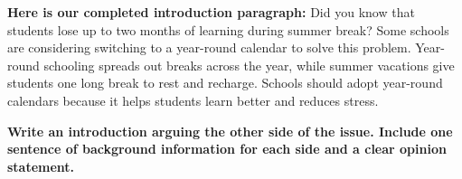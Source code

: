 \documentclass[12pt]{article}
\begin{document}
\begin{tcolorbox}[colframe=black!60, colback=white, 
coltitle=black, colbacktitle=black!15, fonttitle=\bfseries\Large, 
title=Examples, halign title=center, left=10pt, right=10pt, top=10pt, bottom=15pt]
\vspace{1em}

\textbf{Here is  our completed introduction paragraph:} Did you know that students lose up to two months of learning during summer break? Some schools are considering switching to a year-round calendar to solve this problem. Year-round schooling spreads out breaks across the year, while summer vacations give students one long break to rest and recharge. Schools should adopt year-round calendars because it helps students learn better and reduces stress. 










     \end{tcolorbox}

\vspace{1em}
\begin{tcolorbox}[colframe=black!60, colback=white, 
coltitle=black, colbacktitle=black!15, fonttitle=\bfseries\Large, 
title=Guided Practice, halign title=center, left=10pt, right=10pt, top=10pt, bottom=15pt]
\textbf{Write an introduction arguing the other side of the issue. Include one sentence of background information for each side and a clear opinion statement.} 
\vspace{1cm}
\begin{enumerate}[itemsep=4em] %
\\[0.8cm] \underline{\hspace{14.3cm}}  
    \\[0.8cm] \underline{\hspace{14.3cm}}  
    \\[0.8cm] \underline{\hspace{14.3cm}} 
\\[0.8cm] \underline{\hspace{14.3cm}}  
    \\[0.8cm] \underline{\hspace{14.3cm}}  
    \\[0.8cm] \underline{\hspace{14.3cm}} 
    \\[0.8cm] \underline{\hspace{14.3cm}}  
    \\[0.8cm] \underline{\hspace{14.3cm}}  
    \\[0.8cm] \underline{\hspace{14.3cm}}



\end{enumerate}
\vspace{2em}
\end{tcolorbox}
\end{document}
